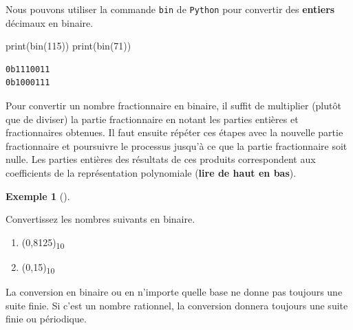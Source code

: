 \documentclass[
  letterpaper,
]{scrbook}
\newenvironment{Shaded}{\begin{snugshade}}{\end{snugshade}}
\newcommand{\BuiltInTok}[1]{\textcolor[rgb]{0.00,0.50,0.00}{#1}}
\newcommand{\DecValTok}[1]{\textcolor[rgb]{0.25,0.63,0.44}{#1}}
\newcommand{\NormalTok}[1]{\textcolor[rgb]{0.00,0.44,0.13}{#1}}
\providecommand{\tightlist}{%
  \setlength{\itemsep}{0pt}\setlength{\parskip}{0pt}}\usepackage{longtable,booktabs,array}
\theoremstyle{plain}
\theoremstyle{definition}
\theoremstyle{definition}
\newtheorem{example}{Exemple}[chapter]
\theoremstyle{remark}
\begin{document}
Nous pouvons utiliser la commande \texttt{bin} de \texttt{Python} pour
convertir des \textbf{entiers} décimaux en binaire.

\hypertarget{conversion-binaire}{}
\begin{Shaded}
\begin{Highlighting}[]
\BuiltInTok{print}\NormalTok{(}\BuiltInTok{bin}\NormalTok{(}\DecValTok{115}\NormalTok{))}
\BuiltInTok{print}\NormalTok{(}\BuiltInTok{bin}\NormalTok{(}\DecValTok{71}\NormalTok{))}
\end{Highlighting}
\end{Shaded}

\begin{verbatim}
0b1110011
0b1000111
\end{verbatim}

Pour convertir un nombre fractionnaire en binaire, il suffit de
multiplier (plutôt que de diviser) la partie fractionnaire en notant les
parties entières et fractionnaires obtenues. Il faut ensuite répéter ces
étapes avec la nouvelle partie fractionnaire et poursuivre le processus
jusqu'à ce que la partie fractionnaire soit nulle. Les parties entières
des résultats de ces produits correspondent aux coefficients de la
représentation polynomiale (\textbf{lire de haut en bas}).

\begin{example}[]\protect\hypertarget{exm-conversion-fractionnaire-binaire}{}\label{exm-conversion-fractionnaire-binaire}

Convertissez les nombres suivants en binaire.

\begin{enumerate}
\def\labelenumi{\alph{enumi})}
\tightlist
\item
  (0,8125)\textsubscript{10}
\item
  (0,15)\textsubscript{10}
\end{enumerate}

\end{example}

\begin{tcolorbox}[enhanced jigsaw, colbacktitle=quarto-callout-important-color!10!white, toptitle=1mm, left=2mm, toprule=.15mm, opacityback=0, bottomrule=.15mm, breakable, coltitle=black, title=\textcolor{quarto-callout-important-color}{\faExclamation}\hspace{0.5em}{Important}, colframe=quarto-callout-important-color-frame, arc=.35mm, titlerule=0mm, rightrule=.15mm, opacitybacktitle=0.6, leftrule=.75mm, bottomtitle=1mm, colback=white]

La conversion en binaire ou en n'importe quelle base ne donne pas
toujours une suite finie. Si c'est un nombre rationnel, la conversion
donnera toujours une suite finie ou périodique.

\end{tcolorbox}
\end{document}
